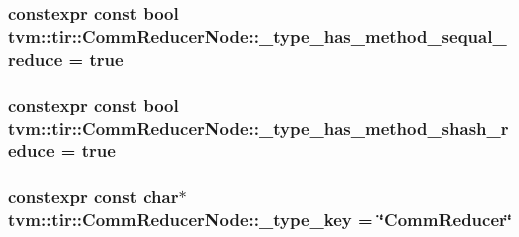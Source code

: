 \subsubsection[{\texorpdfstring{\+\_\+type\+\_\+has\+\_\+method\+\_\+sequal\+\_\+reduce}{_type_has_method_sequal_reduce}}]{\setlength{\rightskip}{0pt plus 5cm}constexpr const bool tvm\+::tir\+::\+Comm\+Reducer\+Node\+::\+\_\+type\+\_\+has\+\_\+method\+\_\+sequal\+\_\+reduce = true\hspace{0.3cm}{\ttfamily [static]}}\hypertarget{classtvm_1_1tir_1_1CommReducerNode_a652ae6d8ae6bbc677d2a1dbfffe6d034}{}\label{classtvm_1_1tir_1_1CommReducerNode_a652ae6d8ae6bbc677d2a1dbfffe6d034}
\subsubsection[{\texorpdfstring{\+\_\+type\+\_\+has\+\_\+method\+\_\+shash\+\_\+reduce}{_type_has_method_shash_reduce}}]{\setlength{\rightskip}{0pt plus 5cm}constexpr const bool tvm\+::tir\+::\+Comm\+Reducer\+Node\+::\+\_\+type\+\_\+has\+\_\+method\+\_\+shash\+\_\+reduce = true\hspace{0.3cm}{\ttfamily [static]}}\hypertarget{classtvm_1_1tir_1_1CommReducerNode_a17818bc2255e3900d4f5cd12a3605ed8}{}\label{classtvm_1_1tir_1_1CommReducerNode_a17818bc2255e3900d4f5cd12a3605ed8}
\subsubsection[{\texorpdfstring{\+\_\+type\+\_\+key}{_type_key}}]{\setlength{\rightskip}{0pt plus 5cm}constexpr const char$\ast$ tvm\+::tir\+::\+Comm\+Reducer\+Node\+::\+\_\+type\+\_\+key = \char`\"{}Comm\+Reducer\char`\"{}\hspace{0.3cm}{\ttfamily [static]}}\hypertarget{classtvm_1_1tir_1_1CommReducerNode_a6018d3a9bcc12cc4b1705dc30161f917}{}\label{classtvm_1_1tir_1_1CommReducerNode_a6018d3a9bcc12cc4b1705dc30161f917}
